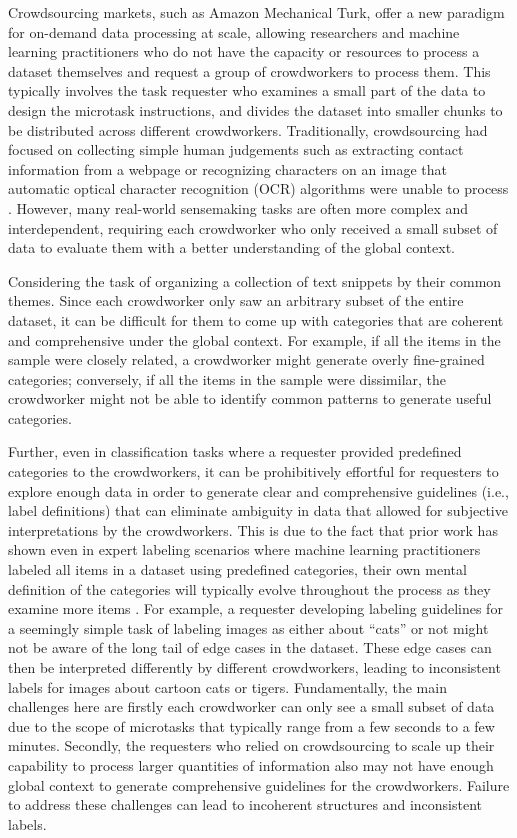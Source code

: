 Crowdsourcing markets, such as Amazon Mechanical Turk, offer a new paradigm for on-demand data processing at scale, allowing researchers and machine learning practitioners who do not have the capacity or resources to process a dataset themselves and request a group of crowdworkers to process them. This typically involves the task requester who examines a small part of the data to design the microtask instructions, and divides the dataset into smaller chunks to be distributed across different crowdworkers. Traditionally, crowdsourcing had focused on collecting simple human judgements such as extracting contact information from a webpage \cite{franklin2011crowddb} or recognizing characters on an image that automatic optical character recognition (OCR) algorithms were unable to process \cite{von2008recaptcha}. However, many real-world sensemaking tasks are often more complex and interdependent, requiring each crowdworker who only received a small subset of data to evaluate them with a better understanding of the global context. 

Considering the task of organizing a collection of text snippets by their common themes. Since each crowdworker only saw an arbitrary subset of the entire dataset, it can be difficult for them to come up with categories that are coherent and comprehensive under the global context. For example, if all the items in the sample were closely related, a crowdworker might generate overly fine-grained categories; conversely, if all the items in the sample were dissimilar, the crowdworker might not be able to identify common patterns to generate useful categories. 

Further, even in classification tasks where a requester provided predefined categories to the crowdworkers, it can be prohibitively effortful for requesters to explore enough data in order to generate clear and comprehensive guidelines (i.e., label definitions) that can eliminate ambiguity in data that allowed for subjective interpretations by the crowdworkers. This is due to the fact that prior work has shown even in expert labeling scenarios where machine learning practitioners labeled all items in a dataset using predefined categories, their own mental definition of the categories will typically evolve throughout the process as they examine more items \cite{kulesza2014structured}. For example, a requester developing labeling guidelines for a seemingly simple task of labeling images as either about ``cats'' or not might not be aware of the long tail of edge cases in the dataset. These edge cases can then be interpreted differently by different crowdworkers, leading to inconsistent labels for images about cartoon cats or tigers. Fundamentally, the main challenges here are firstly each crowdworker can only see a small subset of data due to the scope of microtasks that typically range from a few seconds to a few minutes. Secondly, the requesters who relied on crowdsourcing to scale up their capability to process larger quantities of information also may not have enough global context to generate comprehensive guidelines for the crowdworkers. Failure to address these challenges can lead to incoherent structures and inconsistent labels.

